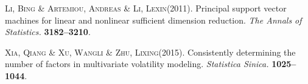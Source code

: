 \documentclass[11pt]{scrartcl} %
\begin{document}
\begin{thebibliography}{}

\textsc{Li, Bing} \& \textsc{Artemiou, Andreas} \& \textsc{Li, Lexin}(2011).
\newblock Principal support vector machines for linear and nonlinear sufficient dimension reduction.
\newblock \textit{The Annals of Statistics.}
\textbf{3182--3210}.

\textsc{Xia, Qiang} \& \textsc{Xu, Wangli} \& \textsc{Zhu, Lixing}(2015).
\newblock Consistently determining the number of factors in multivariate volatility modeling.
\newblock \textit{Statistica Sinica.}
\textbf{1025--1044}.


\end{thebibliography}








\end{document}
